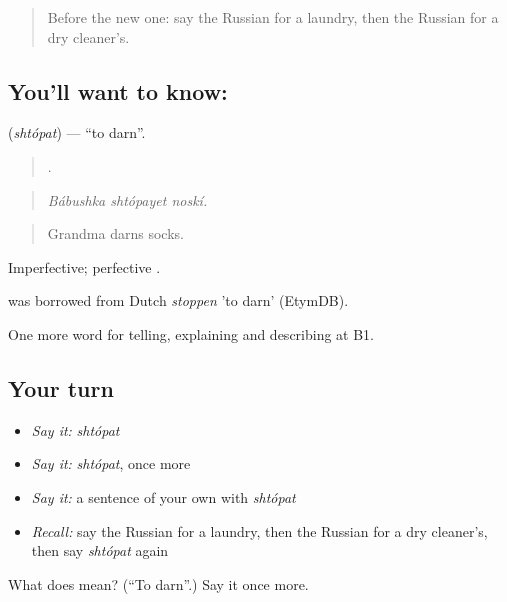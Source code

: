 \label{lesson:RU-C448-shtopat}



\begin{quote}
Before the new one: say the Russian for a laundry, then the Russian for a dry cleaner's.
\end{quote}

\subsection*{You'll want to know: }
\textbf{} (\emph{shtópat}) — \textquotedblleft{}to darn\textquotedblright{}.

\begin{quote}
  .
\end{quote}

\begin{quote}
\emph{Bábushka shtópayet noskí.}
\end{quote}

\begin{quote}
Grandma darns socks.
\end{quote}

Imperfective; perfective \emph{}.

\begin{cousinweb}
\emph{} was borrowed from Dutch \emph{stoppen} 'to darn' (EtymDB).
\end{cousinweb}

\begin{grammarlens}[title={What you've built}]
One more word for telling, explaining and describing at B1.
\end{grammarlens}

\subsection*{Your turn}
\begin{itemize}
\raggedright
  \item \emph{Say it:} \emph{shtópat}
  \item \emph{Say it:} \emph{shtópat}, once more
  \item \emph{Say it:} a sentence of your own with \emph{shtópat}
  \item \emph{Recall:} say the Russian for a laundry, then the Russian for a dry cleaner's, then say \emph{shtópat} again
\end{itemize}

\begin{tcolorbox}[breakable,colback=teal!4,colframe=teal!35!black,title={Before you move on}]
What does  mean? (\textquotedblleft{}To darn\textquotedblright{}.) Say it once more.
\end{tcolorbox}
